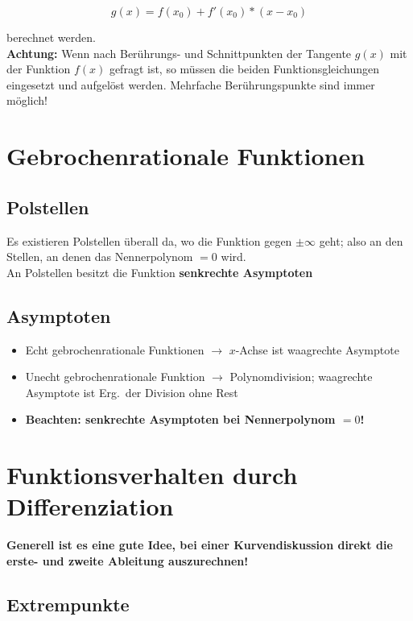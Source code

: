 \documentclass[12pt, a4paper]{scrreprt}
\begin{document}
\[
  g(x)= f(x_0) + f'(x_0) * (x - x_0)
\]

berechnet werden.\\[1em]
\textbf{Achtung:} Wenn nach Berührungs- und Schnittpunkten der Tangente \(g(x)\) mit der Funktion \(f(x)\) gefragt ist, so müssen die beiden Funktionsgleichungen\\ eingesetzt und aufgelöst werden. Mehrfache Berührungspunkte sind immer möglich!


\section{Gebrochenrationale Funktionen}

\subsection{Polstellen}
Es existieren Polstellen überall da, wo die Funktion gegen $\pm \infty$ geht; also an den Stellen, an denen das Nennerpolynom \(=0\) wird.\\
An Polstellen besitzt die Funktion \textbf{senkrechte Asymptoten}

\subsection{Asymptoten}
\begin{itemize}
\item Echt gebrochenrationale Funktionen $\rightarrow$ \(x\)-Achse ist waagrechte Asymptote
\item Unecht gebrochenrationale Funktion $\rightarrow$ Polynomdivision; waagrechte Asymptote ist Erg.\ der Division ohne Rest
\item \textbf{Beachten: senkrechte Asymptoten bei Nennerpolynom \(=0\)!}
\end{itemize}

\section{Funktionsverhalten durch Differenziation}

\begin{framed}
  \textbf{Generell ist es eine gute Idee, bei einer Kurvendiskussion direkt die erste- und zweite Ableitung auszurechnen!}
\end{framed}


\subsection{Extrempunkte}
\end{document}
